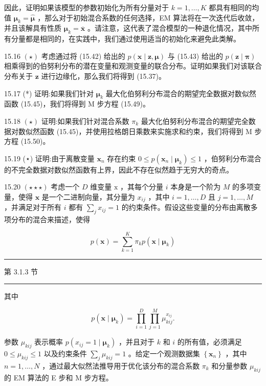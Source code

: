 \documentclass[10pt]{article}
\newcommand{\HRule}{\begin{center}\rule{0.9\linewidth}{0.2mm}\end{center}}
\begin{document}
因此，证明如果该模型的参数初始化为所有分量对于 \(k = 1,\ldots ,K\) 都具有相同的均值 \({\mathbf{\mu }}_{k} = \widehat{\mathbf{\mu }}\) ，那么对于初始混合系数的任何选择，EM 算法将在一次迭代后收敛，并且该解具有性质 \({\mathbf{\mu }}_{k} = \overline{\mathbf{x}}\) 。请注意，这代表了混合模型的一种退化情况，其中所有分量都是相同的，在实践中，我们通过使用适当的初始化来避免此类解。

15.16 \(\left( \star \right)\) 考虑通过将 (15.42) 给出的 \(p\left( {\mathbf{x} \mid  \mathbf{z},\mathbf{\mu }}\right)\) 与 (15.43) 给出的 \(p\left( {\mathbf{z} \mid  \mathbf{\pi }}\right)\) 相乘得到的伯努利分布的潜在变量和观测变量的联合分布。证明如果我们对该联合分布关于 \(\mathbf{z}\) 进行边缘化，那么我们将得到 (15.37)。

15.17 (*) 证明:如果我们针对 \({\mathbf{\mu }}_{k}\) 最大化伯努利分布混合的期望完全数据对数似然函数 (15.45)，我们将得到 M 步方程 (15.49)。

15.18 \(\left( \star \right)\) 证明:如果我们针对混合系数 \({\pi }_{k}\) 最大化伯努利分布混合的期望完全数据对数似然函数 (15.45)，并使用拉格朗日乘数来实施求和约束，我们将得到 M 步方程 (15.50)。

15.19 (⋆) 证明:由于离散变量 \({\mathbf{x}}_{n}\) 存在约束 \(0 \leq  p\left( {{\mathbf{x}}_{n} \mid  {\mathbf{\mu }}_{k}}\right)  \leq  1\) ，伯努利分布混合的不完全数据对数似然函数有上界，因此不存在似然趋于无穷大的奇点。

15.20 \(\left( {\star  \star   \star  }\right)\) 考虑一个 \(D\) 维变量 \(\mathrm{x}\) ，其每个分量 \(i\) 本身是一个阶为 \(M\) 的多项变量，使得 \(\mathbf{x}\) 是一个二进制向量，其分量为 \({x}_{ij}\) ，其中 \(i = 1,\ldots ,D\) 且 \(j = 1,\ldots ,M\) ，并满足对于所有 \(i\) 都有 \(\mathop{\sum }\limits_{j}{x}_{ij} = 1\) 的约束条件。假设这些变量的分布由离散多项分布的混合来描述，使得

\[
p\left( \mathbf{x}\right)  = \mathop{\sum }\limits_{{k = 1}}^{K}{\pi }_{k}p\left( {\mathbf{x} \mid  {\mathbf{\mu }}_{k}}\right)  \tag{15.66}
\]

\HRule

第 3.1.3 节

\HRule

其中

\[
p\left( {\mathbf{x} \mid  {\mathbf{\mu }}_{k}}\right)  = \mathop{\prod }\limits_{{i = 1}}^{D}\mathop{\prod }\limits_{{j = 1}}^{M}{\mu }_{kij}^{{x}_{ij}}. \tag{15.67}
\]

参数 \({\mu }_{kij}\) 表示概率 \(p\left( {{x}_{ij} = 1 \mid  {\mathbf{\mu }}_{k}}\right)\) ，并且对于 \(k\) 和 \(i\) 的所有值，必须满足 \(0 \leq  {\mu }_{kij} \leq  1\) 以及约束条件 \(\mathop{\sum }\limits_{j}{\mu }_{kij} = 1\) 。给定一个观测数据集 \(\left\{  {\mathbf{x}}_{n}\right\}\) ，其中 \(n = 1,\ldots ,N\) ，通过最大似然法推导用于优化该分布的混合系数 \({\pi }_{k}\) 和分量参数 \({\mu }_{kij}\) 的 EM 算法的 E 步和 M 步方程。
\end{document}
